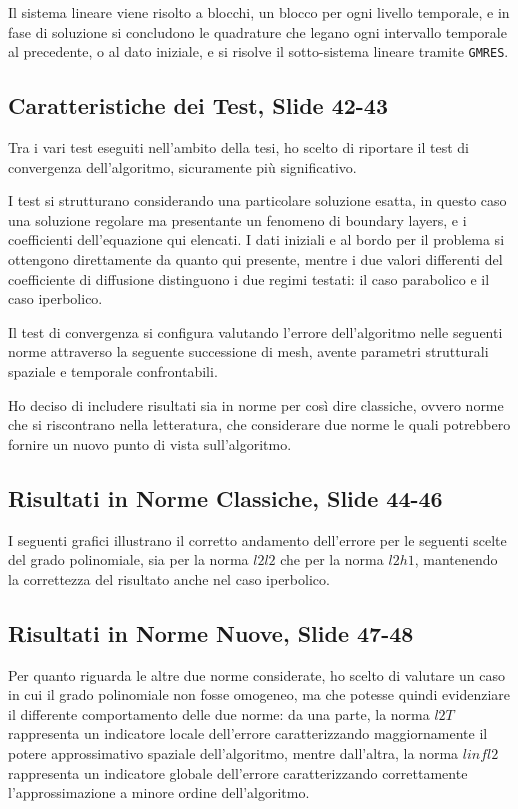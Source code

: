 \documentclass[12pt]{article}
\begin{document}
    Il sistema lineare viene risolto a blocchi, un blocco per ogni livello temporale, e in fase di soluzione si concludono le quadrature che legano ogni intervallo temporale al precedente, o al dato iniziale, e si risolve il sotto-sistema lineare tramite \lstinline{GMRES}.

    \subsection{Caratteristiche dei Test, Slide 42-43}

    Tra i vari test eseguiti nell'ambito della tesi, ho scelto di riportare il test di convergenza dell'algoritmo, sicuramente più significativo.

    I test si strutturano considerando una particolare soluzione esatta, in questo caso una soluzione regolare ma presentante un fenomeno di boundary layers, e i coefficienti dell'equazione qui elencati. I dati iniziali e al bordo per il problema si ottengono direttamente da quanto qui presente, mentre i due valori differenti del coefficiente di diffusione distinguono i due regimi testati: il caso parabolico e il caso iperbolico.

    Il test di convergenza si configura valutando l'errore dell'algoritmo nelle seguenti norme attraverso la seguente successione di mesh, avente parametri strutturali spaziale e temporale confrontabili.

    Ho deciso di includere risultati sia in norme per così dire classiche, ovvero norme che si riscontrano nella letteratura, che considerare due norme le quali potrebbero fornire un nuovo punto di vista sull'algoritmo.

    \subsection{Risultati in Norme Classiche, Slide 44-46}

    I seguenti grafici illustrano il corretto andamento dell'errore per le seguenti scelte del grado polinomiale, sia per la norma $l2l2$ che per la norma $l2h1$, mantenendo la correttezza del risultato anche nel caso iperbolico.

    \subsection{Risultati in Norme Nuove, Slide 47-48}

    Per quanto riguarda le altre due norme considerate, ho scelto di valutare un caso in cui il grado polinomiale non fosse omogeneo, ma che potesse quindi evidenziare il differente comportamento delle due norme: da una parte, la norma $l2T$ rappresenta un indicatore locale dell'errore caratterizzando maggiornamente il potere approssimativo spaziale dell'algoritmo, mentre dall'altra, la norma $linfl2$ rappresenta un indicatore globale dell'errore caratterizzando correttamente l'approssimazione a minore ordine dell'algoritmo.
\end{document}
